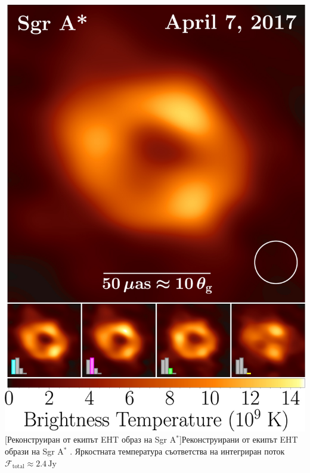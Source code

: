 \noindent\begin{minipage}{14em}
	\centering
	\includegraphics[scale = 0.6]{SgrA_Avg_Images.jpg}
	[Реконструиран от екипът EHT образ на Sgr A$^*$]{\small Реконструирани от екипът EHT образи на Sgr A$^*$ \cite{EHT_SGR_I}. Яркостната температура съответства на интегриран поток $\mathcal{F}_{\text{total}}\approx2.4\,\text{Jy}$}
	\label{SgrA_I_Image}
\end{minipage}\,\,
